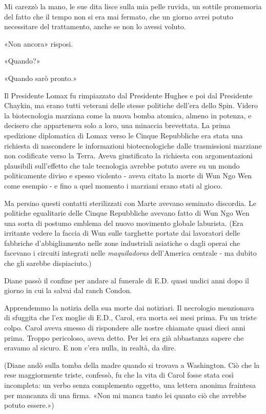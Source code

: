 Mi carezzò la mano, le sue dita lisce sulla mia pelle ruvida, un sottile
promemoria del fatto che il tempo non si era mai fermato, che un giorno
avrei potuto necessitare del trattamento, anche se non lo avessi voluto.

«Non ancora» risposi.

«Quando?»

«Quando sarò pronto.»

\separatorefiori

Il Presidente Lomax fu rimpiazzato dal Presidente Hughes e poi dal
Presidente Chaykin, ma erano tutti veterani delle stesse politiche
dell'era dello Spin. Videro la biotecnologia marziana come la nuova
bomba atomica, almeno in potenza, e decisero che apparteneva solo a
loro, una minaccia brevettata. La prima spedizione diplomatica di Lomax
verso le Cinque Repubbliche era stata una richiesta di nascondere le
informazioni biotecnologiche dalle trasmissioni marziane non codificate
verso la Terra. Aveva giustificato la richiesta con argomentazioni
plausibili sull'effetto che tale tecnologia avrebbe potuto avere su un
mondo politicamente diviso e spesso violento - aveva citato la morte di
Wun Ngo Wen come esempio - e fino a quel momento i marziani erano stati
al gioco.

Ma persino questi contatti sterilizzati con Marte avevano seminato
discordia. Le politiche egualitarie delle Cinque Repubbliche avevano
fatto di Wun Ngo Wen una sorta di postumo emblema del nuovo movimento
globale laburista. (Era irritante vedere la faccia di Wun sulle
targhette portate dai lavoratori delle fabbriche d'abbigliamento nelle
zone industriali asiatiche o dagli operai che facevano i circuiti
integrati nelle \emph{maquiladoras} dell'America centrale - ma dubito
che gli sarebbe dispiaciuto.)

\separatorefiori

Diane passò il confine per andare al funerale di E.D. quasi undici anni
dopo il giorno in cui la salvai dal ranch Condon.

Apprendemmo la notizia della sua morte dai notiziari. Il necrologio
menzionava di sfuggita che l'ex moglie di E.D., Carol, era morta sei
mesi prima. Fu un triste colpo. Carol aveva smesso di rispondere alle
nostre chiamate quasi dieci anni prima. Troppo pericoloso, aveva detto.
Per lei era già abbastanza sapere che eravamo al sicuro. E non c'era
nulla, in realtà, da dire.

(Diane andò sulla tomba della madre quando si trovava a Washington. Ciò
che la rese maggiormente triste, confessò, fu che la vita di Carol fosse
stata così incompleta: un verbo senza complemento oggetto, una lettera
anonima fraintesa per mancanza di una firma. «Non mi manca tanto lei
quanto ciò che avrebbe potuto essere.»)

